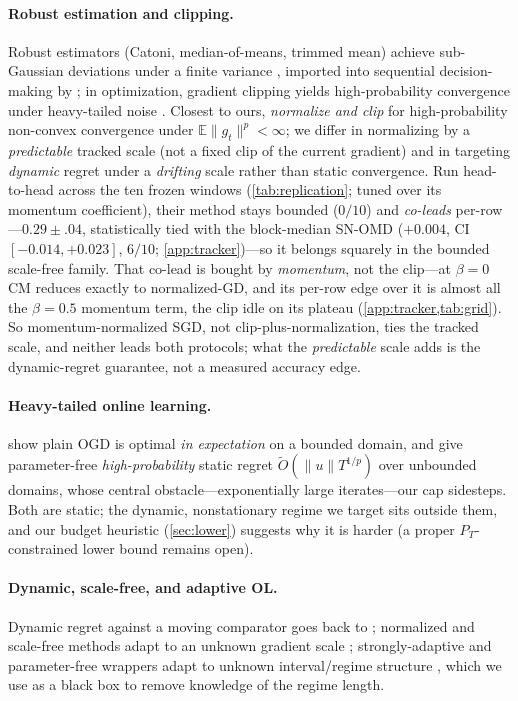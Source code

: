 \documentclass{article}
\newcommand{\norm}[1]{\lVert #1 \rVert}
\newcommand{\gt}{g_t}
\begin{document}
\paragraph{Robust estimation and clipping.} Robust estimators (Catoni, median-of-means,
trimmed mean) achieve sub-Gaussian deviations under a finite variance
\citep{catoni2012,devroye2016,lugosi2019}, imported into sequential decision-making by
\citet{bubeck2013}; in optimization, gradient clipping yields high-probability convergence
under heavy-tailed noise \citep{zhang2020clip,gorbunov2020,nguyen2023}. Closest to ours,
\citet{cutkoskymehta2021} \emph{normalize and clip} for high-probability non-convex
convergence under $\mathbb{E}\norm{\gt}^p\!<\!\infty$; we differ in normalizing by a
\emph{predictable} tracked scale (not a fixed clip of the current gradient) and in targeting
\emph{dynamic} regret under a \emph{drifting} scale rather than static convergence. Run
head-to-head across the ten frozen windows (\cref{tab:replication}; tuned over its momentum
coefficient), their method stays bounded ($0/10$) and \emph{co-leads} per-row---$0.29\!\pm\!.04$,
statistically tied with the block-median SN-OMD ($+0.004$, CI $[-0.014,+0.023]$, $6/10$;
\cref{app:tracker})---so it belongs squarely in the bounded scale-free family. That co-lead is
bought by \emph{momentum}, not the clip---at $\beta{=}0$ CM reduces exactly to normalized-GD,
and its per-row edge over it is almost all the $\beta{=}0.5$ momentum term, the clip idle on its
plateau (\cref{app:tracker,tab:grid}). So momentum-normalized SGD, not clip-plus-normalization,
ties the tracked scale, and neither leads both protocols; what the \emph{predictable} scale adds
is the dynamic-regret guarantee, not a measured accuracy edge.

\paragraph{Heavy-tailed online learning.} \citet{zhang2026oco} show plain OGD is optimal
\emph{in expectation} on a bounded domain, and \citet{zhangcutkosky2022} give parameter-free
\emph{high-probability} static regret $\tilde O(\norm u T^{1/p})$ over unbounded domains,
whose central obstacle---exponentially large iterates---our cap sidesteps. Both are static;
the dynamic, nonstationary regime we target sits outside them, and our budget heuristic
(\cref{sec:lower}) suggests why it is harder (a proper $P_T$-constrained lower bound remains
open).

\paragraph{Dynamic, scale-free, and adaptive OL.} Dynamic regret against a moving comparator
goes back to \citet{zinkevich2003}; normalized and scale-free methods adapt to an unknown
gradient scale \citep{levy2017,orabona2018}; strongly-adaptive and parameter-free wrappers adapt to unknown
interval/regime structure \citep{daniely2015,cutkosky2020}, which we use as a black box to
remove knowledge of the regime length.
\end{document}
